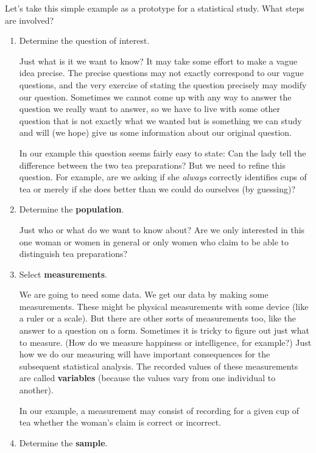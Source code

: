 \documentclass[twoside]{book}\usepackage[]{graphicx}\usepackage[]{xcolor}
\def\myindex#1{\index{#1}}
\def\term#1{\textbf{#1}}
\newcounter{example}[section]
\begin{document}
Let's take this simple example as a prototype for a statistical study.
What steps are involved?  
\begin{enumerate}
  \item Determine the question of interest.

	Just what is it we want to know?  It may take some effort to 
	make a vague idea precise.  The precise questions may not exactly
	correspond to our vague questions, and the very exercise of 
	stating the question precisely may modify our question.  Sometimes
	we cannot come up with any way to answer the question we really want
	to answer, so we have to live with some other question that is 
	not exactly what we wanted but is something we can study and will
	(we hope) give us some information about our original question.

	In our example this question seems fairly easy to state:
	Can the lady tell the difference between the two tea preparations?
	But we need to refine this question.  For example, are we 
	asking if she \emph{always} correctly identifies cups of tea
	or merely if she does better than we could do ourselves (by 
	guessing)?  

  \item 
	Determine the \term{population}. 
	\myindex{population}%

	Just who or what do we want to know about?  Are we only interested in
	this one woman or women in general or only women who claim to
	be able to distinguish tea preparations?

  \item
	Select \term{measurements}.

	We are going to need some data.  
	We get our data by making some measurements.
	These might be physical measurements with some device (like a ruler
	or a scale).
	But there are other sorts of measurements too, 
	like the answer to a question on a form.
	Sometimes it is tricky to figure out just what to measure.
	(How do we measure happiness or intelligence, for example?)
	Just how we do our measuring will have important consequences 
	for the subsequent statistical analysis.
	The recorded values of these measurements are called
	\term{variables} (because the values vary from one individual to another).

	In our example, a measurement may consist of recording for a given
	cup of tea whether the woman's claim is correct or incorrect.

  \item
	Determine the \term{sample}.
	\myindex{sample}%


\end{enumerate}
\end{document}
